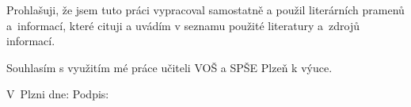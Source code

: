 \noindent
Prohlašuji, že jsem tuto práci vypracoval samostatně a použil literárních
pramenů a~informací, které cituji a uvádím v seznamu použité literatury
a~zdrojů informací.

\noindent
Souhlasím s využitím mé práce učiteli VOŠ a SPŠE Plzeň k výuce.

{%
    \raggedright
    \hfill V~Plzni dne: \dotfill \hspace*{1em}Podpis: \dotfill
}

